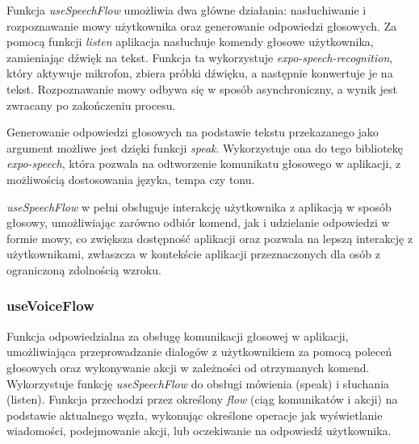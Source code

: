 Funkcja \textit{useSpeechFlow} umożliwia dwa główne działania: nasłuchiwanie i rozpoznawanie mowy użytkownika oraz generowanie odpowiedzi głosowych. Za pomocą funkcji \textit{listen} aplikacja nasłuchuje komendy głosowe użytkownika, zamieniając dźwięk na tekst. Funkcja ta wykorzystuje \textit{expo-speech-recognition}, który aktywuje mikrofon, zbiera próbki dźwięku, a następnie konwertuje je na tekst. Rozpoznawanie mowy odbywa się w sposób asynchroniczny, a wynik jest zwracany po zakończeniu procesu.

Generowanie odpowiedzi głosowych na podstawie tekstu przekazanego jako argument możliwe jest dzięki funkcji \textit{speak}. Wykorzystuje ona do tego bibliotekę \textit{expo-speech}, która pozwala na odtworzenie komunikatu głosowego w aplikacji, z możliwością dostosowania języka, tempa czy tonu.

\textit{useSpeechFlow} w pełni obsługuje interakcję użytkownika z aplikacją w sposób głosowy, umożliwiając zarówno odbiór komend, jak i udzielanie odpowiedzi w formie mowy, co zwiększa dostępność aplikacji oraz pozwala na lepszą interakcję z użytkownikami, zwłaszcza w kontekście aplikacji przeznaczonych dla osób z ograniczoną zdolnością wzroku.
  
\subsubsection{useVoiceFlow}

Funkcja odpowiedzialna za obsługę komunikacji głosowej w aplikacji, umożliwiająca przeprowadzanie dialogów z użytkownikiem za pomocą poleceń głosowych oraz wykonywanie akcji w zależności od otrzymanych komend. Wykorzystuje funkcję \textit{useSpeechFlow} do obsługi mówienia (speak) i słuchania (listen). Funkcja przechodzi przez określony \textit{flow} (ciąg komunikatów i akcji) na podstawie aktualnego węzła, wykonując określone operacje jak wyświetlanie wiadomości, podejmowanie akcji, lub oczekiwanie na odpowiedź użytkownika.
    
